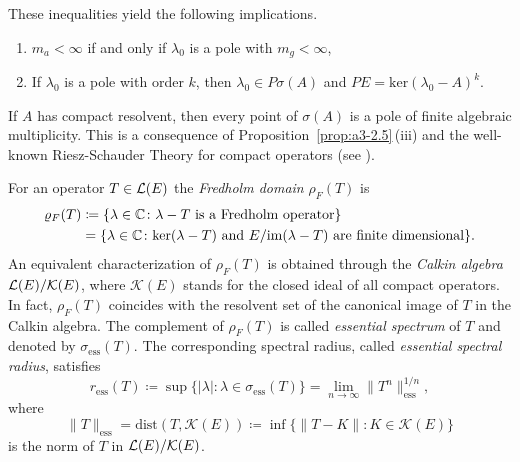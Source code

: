 \begin{example}
These inequalities yield the following implications.
\begin{enumerate}[\upshape (i)]
\item
$m_{a} < \infty$ if and only if\/ $\lambda_{0}$ is a pole with $m_{g} < \infty$,
\item
If\/ $\lambda_{0}$ is a pole with order $k$, then $\lambda_{0} \in P\sigma(A)$ and $PE = \text{ker}(\lambda_{0} - A)^{k}$.
\end{enumerate}
If\/ $A$ has compact resolvent,%
then every point of\/ $\sigma(A)$ is a pole of finite algebraic multiplicity.
This is a consequence of Proposition~\ref{prop:a3-2.5}\,(iii) and the well-known Riesz-Schauder Theory for compact operators (see \textcite[VII.4.5]{dunfordschwartz:1958}).
\end{example}
\begin{example}\label{ex:a3-3.7}	%
For an operator $T \in \mathcal{L}(E)$ the \emph{Fredholm domain} $\rho_{F}(T)$ is
\begin{equation}\label{eq:a3-3.5} 
\begin{aligned}
	\rho_{F}(T) & \coloneq  \{\lambda \in \C \colon \lambda - T \text{ is a Fredholm operator}\}\\
	& =  \{\lambda \in \C \colon \text{ker}(\lambda - T) \text{ and }  E / \mathrm{im}(\lambda - T) \text{ are finite dimensional}\}.
\end{aligned}
\end{equation}
An equivalent characterization of\/ $\rho_{F}(T)$ is obtained through the \emph{Calkin algebra}%
$\mathcal{L}(E)/\mathcal{K}(E)$, where $\mathcal{K}(E)$ stands for the closed ideal of all compact operators.
In fact, $\rho_{F}(T)$ coincides with the resolvent set of the canonical image of\/ $T$ in the Calkin algebra.
The complement of\/ $\rho_{F}(T)$ is called \emph{essential spectrum} 
of\/ $T$ and denoted by $\sigma_{\text{ess}}(T)$.
The corresponding spectral radius, called \emph{essential spectral radius},  
satisfies
\begin{equation}\label{eq:a3-3.6}
r_{\text{ess}}(T) \coloneq \sup \{|\lambda| \colon \lambda \in \sigma_{\text{ess}}(T)\} = \lim_{n \to \infty} \|T^{n}\|_{\text{ess}}^{1/n} ,
\end{equation}
where 
%
\[
	\|T\|_{\text{ess}} = \text{dist}(T,\mathcal{K}(E)) \coloneq \inf \{\|T - K\| \colon K \in \mathcal{K}(E)\}
\]
%
is the norm of\/ $T$ in $\mathcal{L}(E)/\mathcal{K}(E)$. 


\end{example}
